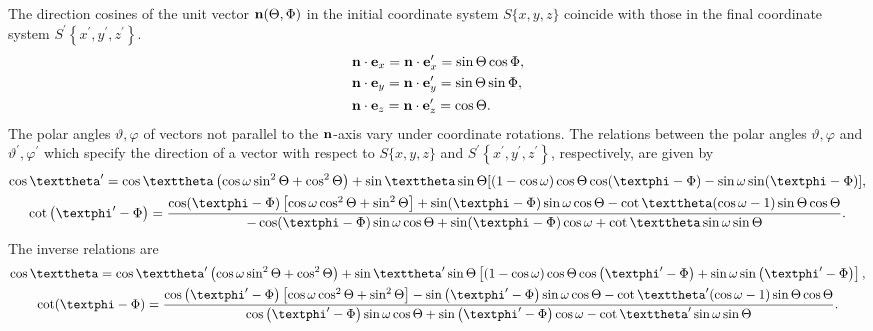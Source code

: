 The direction cosines of the unit vector \(\mathbf{n}(\Theta, \Phi)\) in the initial coordinate system \(S\{x, y, z\}\) coincide with those in the final coordinate system \(S^{\prime}\left\{x^{\prime}, y^{\prime}, z^{\prime}\right\}\).
\begin{align}
& \mathbf{n} \cdot \mathbf{e}_{x}=\mathbf{n} \cdot \mathbf{e}_{x}^{\prime}=\sin \Theta \cos \Phi , \notag\\
& \mathbf{n} \cdot \mathbf{e}_{y}=\mathbf{n} \cdot \mathbf{e}_{y}^{\prime}=\sin \Theta \sin \Phi , \label{eq:1:4:4}\\
& \mathbf{n} \cdot \mathbf{e}_{z}=\mathbf{n} \cdot \mathbf{e}_{z}^{\prime}=\cos \Theta \notag .
\end{align}
The polar angles \(\vartheta, \varphi\) of vectors not parallel to the $\mathbf{n}$-axis vary under coordinate rotations. The relations between the polar angles \(\vartheta, \varphi\) and \(\vartheta^{\prime}, \varphi^{\prime}\) which specify the direction of a vector with respect to \(S\{x, y, z\}\) and \(S^{\prime}\left\{x^{\prime}, y^{\prime}, z^{\prime}\right\}\), respectively, are given by
\begin{gather}
\cos \vartheta^{\prime}=\cos \vartheta\left(\cos \omega \sin ^{2} \Theta+\cos ^{2} \Theta\right)+\sin \vartheta \sin \Theta[(1-\cos \omega) \cos \Theta \cos (\varphi-\Phi)-\sin \omega \sin (\varphi-\Phi)]  ,\notag\\
\cot \left(\varphi^{\prime}-\Phi\right)=\frac{\cos (\varphi-\Phi)\left[\cos \omega \cos ^{2} \Theta+\sin ^{2} \Theta\right]+\sin (\varphi-\Phi) \sin \omega \cos \Theta-\cot \vartheta(\cos \omega-1) \sin \Theta \cos \Theta}{-\cos (\varphi-\Phi) \sin \omega \cos \Theta+\sin (\varphi-\Phi) \cos \omega+\cot \vartheta \sin \omega \sin \Theta} .\label{eq:1:4:5}
\end{gather}
The inverse relations are
\begin{gather}
\cos \vartheta=\cos \vartheta^{\prime}\left(\cos \omega \sin ^{2} \Theta+\cos ^{2} \Theta\right)+\sin \vartheta^{\prime} \sin \Theta\left[(1-\cos \omega) \cos \Theta \cos \left(\varphi^{\prime}-\Phi\right)+\sin \omega \sin \left(\varphi^{\prime}-\Phi\right)\right] , \notag\\
\cot (\varphi-\Phi)=\frac{\cos \left(\varphi^{\prime}-\Phi\right)\left[\cos \omega \cos ^{2} \Theta+\sin ^{2} \Theta\right]-\sin \left(\varphi^{\prime}-\Phi\right) \sin \omega \cos \Theta-\cot \vartheta^{\prime}(\cos \omega-1) \sin \Theta \cos \Theta}{\cos \left(\varphi^{\prime}-\Phi\right) \sin \omega \cos \Theta+\sin \left(\varphi^{\prime}-\Phi\right) \cos \omega-\cot \vartheta^{\prime} \sin \omega \sin \Theta} .\label{eq:1:4:6}
\end{gather}
